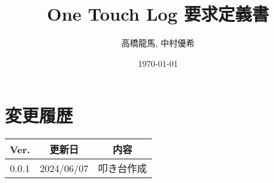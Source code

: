 \documentclass[a4paper,10pt,titlepage]{jreport}
\begin{document}
\title{One Touch Log 要求定義書}
\author{高橋龍馬, 中村優希}
\date{\today}
\maketitle

\section*{変更履歴}

\begin{longtable}[c]{|c|c|c|}
    \hline
        Ver. & 更新日 & 内容 \\
    \hline
    \endfirsthead
    \hline
        0.0.1 & 2024/06/07 & 叩き台作成 \\
    \hline
\end{longtable}

\newpage

\tableofcontents
\clearpage





\end{document}
